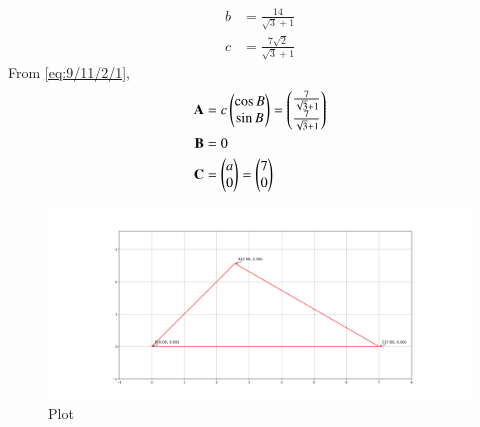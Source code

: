 \documentclass[journal]{IEEEtran}
\begin{document}
\begin{align}
    b&=\frac{14}{\sqrt{3}+1}\\
    c&=\frac{7\sqrt{2}}{\sqrt{3}+1}
\end{align}
 From \eqref{eq:9/11/2/1},
 \begin{align}
 \mathbf{A}&=c\begin{pmatrix}\cos B\\ \sin B\end{pmatrix}=\begin{pmatrix}\frac{7}{\sqrt{3}+1} \\ \frac{7}{\sqrt{3}+1}\end{pmatrix}\\
\mathbf{B}&=0\\
\mathbf{C}&=\begin{pmatrix}a \\ 0\end{pmatrix}=\begin{pmatrix}7\\0\end{pmatrix}
 \end{align}
\begin{figure}[h!]
   \centering
   \includegraphics[width=1.1\columnwidth]{Figs/Figure_1.png}
   \caption{Plot}
   \label{3-3.3-8-Figure}
\end{figure}
\end{document}
